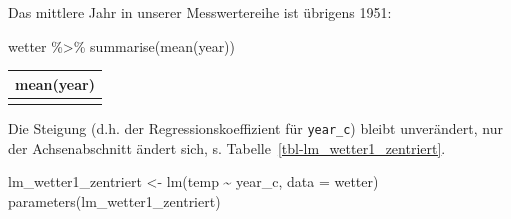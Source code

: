 \documentclass[
  a4paper,
]{scrbook}
\newenvironment{Shaded}{\begin{snugshade}}{\end{snugshade}}
\newcommand{\AttributeTok}[1]{\textcolor[rgb]{0.40,0.45,0.13}{#1}}
\newcommand{\FunctionTok}[1]{\textcolor[rgb]{0.28,0.35,0.67}{#1}}
\newcommand{\NormalTok}[1]{\textcolor[rgb]{0.00,0.23,0.31}{#1}}
\newcommand{\OtherTok}[1]{\textcolor[rgb]{0.00,0.23,0.31}{#1}}
\newcommand{\SpecialCharTok}[1]{\textcolor[rgb]{0.37,0.37,0.37}{#1}}
\theoremstyle{definition}
\theoremstyle{definition}
\theoremstyle{definition}
\theoremstyle{remark}
\begin{document}
Das mittlere Jahr in unserer Messwertereihe ist übrigens 1951:

\begin{Shaded}
\begin{Highlighting}[]
\NormalTok{wetter }\SpecialCharTok{\%\textgreater{}\%} 
  \FunctionTok{summarise}\NormalTok{(}\FunctionTok{mean}\NormalTok{(year))}
\end{Highlighting}
\end{Shaded}

\begin{longtable}[]{@{}r@{}}
\toprule\noalign{}
mean(year) \\
\midrule\noalign{}
\endhead
\bottomrule\noalign{}
\endlastfoot
1951 \\
\end{longtable}

Die Steigung (d.h. der Regressionskoeffizient für \texttt{year\_c})
bleibt unverändert, nur der Achsenabschnitt ändert sich, s.
Tabelle~\ref{tbl-lm_wetter1_zentriert}.

\begin{Shaded}
\begin{Highlighting}[]
\NormalTok{lm\_wetter1\_zentriert }\OtherTok{\textless{}{-}} \FunctionTok{lm}\NormalTok{(temp }\SpecialCharTok{\textasciitilde{}}\NormalTok{ year\_c, }\AttributeTok{data =}\NormalTok{ wetter)}
\FunctionTok{parameters}\NormalTok{(lm\_wetter1\_zentriert)}
\end{Highlighting}
\end{Shaded}
\end{document}
